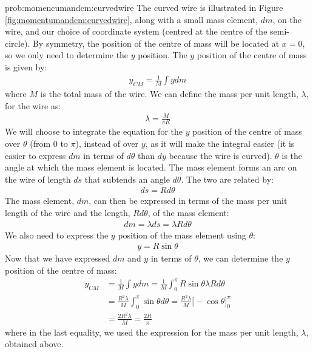 \begin{solution}{prob:momencumandcm:curvedwire}\label{soln:momentumandcm:curvedwire} 
The curved wire is illustrated in Figure \ref{fig:momentumandcm:curvedwire}, along with a small mass element, $dm$, on the wire, and our choice of coordinate system (centred at the centre of the semi-circle). By symmetry, the position of the centre of mass will be located at $x=0$, so we only need to determine the $y$ position.
The $y$ position of the centre of mass is given by:
\begin{align*}
y_{CM} = \frac{1}{M}\int y dm
\end{align*}
where $M$ is the total mass of the wire. We can define the mass per unit length, $\lambda$, for the wire as:
\begin{align*}
\lambda =\frac{M}{\pi R}
\end{align*}
We will choose to integrate the equation for the $y$ position of the centre of mass over $\theta$ (from 0 to $\pi$), instead of over $y$, as it will make the integral easier (it is easier to express $dm$ in terms of $d\theta$ than $dy$ because the wire is curved). $\theta$ is the angle at which the mass element is located. The mass element forms an arc on the wire of length $ds$ that subtends an angle $d\theta$. The two are related by:
\begin{align*}
ds = Rd\theta
\end{align*}
The mass element, $dm$, can then be expressed in terms of the mass per unit length of the wire and the length, $Rd\theta$, of the mass element:
\begin{align*}
dm = \lambda ds = \lambda Rd\theta
\end{align*}
We also need to express the $y$ position of the mass element using $\theta$:
\begin{align*}
y = R\sin\theta
\end{align*}
Now that we have expressed $dm$ and $y$ in terms of $\theta$, we can determine the $y$ position of the centre of mass:
\begin{align*}
y_{CM}  &= \frac{1}{M}\int y dm =  \frac{1}{M}\int_0^\pi R\sin\theta \lambda Rd\theta\\
&= \frac{R^2\lambda}{M}\int_0^\pi \sin\theta d\theta = \frac{R^2\lambda}{M} \bigl[-\cos\theta\bigr]_0^\pi\\
&=\frac{2R^2\lambda}{M}=\frac{2R}{\pi}
\end{align*}
where in the last equality, we used the expression for the mass per unit length, $\lambda$, obtained above.
\end{solution}



